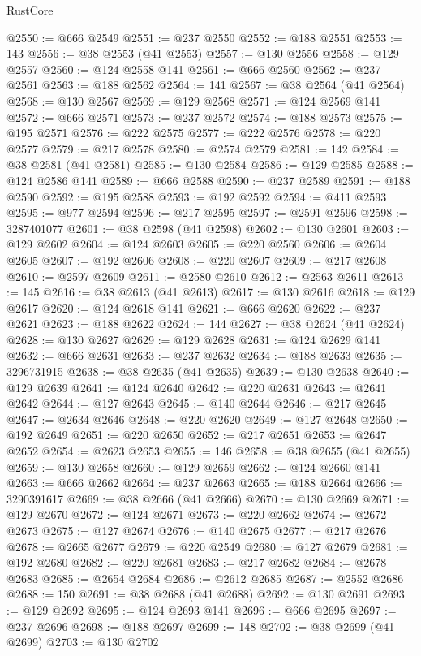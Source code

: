 \begin{lexlean}{RustCore}
\begin{coremodule}
@2550 := @666 @2549
@2551 := @237 @2550
@2552 := @188 @2551
@2553 := 143
@2556 := @38 @2553 (@41 @2553)
@2557 := @130 @2556
@2558 := @129 @2557
@2560 := @124 @2558 @141
@2561 := @666 @2560
@2562 := @237 @2561
@2563 := @188 @2562
@2564 := 141
@2567 := @38 @2564 (@41 @2564)
@2568 := @130 @2567
@2569 := @129 @2568
@2571 := @124 @2569 @141
@2572 := @666 @2571
@2573 := @237 @2572
@2574 := @188 @2573
@2575 := @195 @2571
@2576 := @222 @2575
@2577 := @222 @2576
@2578 := @220 @2577
@2579 := @217 @2578
@2580 := @2574 @2579
@2581 := 142
@2584 := @38 @2581 (@41 @2581)
@2585 := @130 @2584
@2586 := @129 @2585
@2588 := @124 @2586 @141
@2589 := @666 @2588
@2590 := @237 @2589
@2591 := @188 @2590
@2592 := @195 @2588
@2593 := @192 @2592
@2594 := @411 @2593
@2595 := @977 @2594
@2596 := @217 @2595
@2597 := @2591 @2596
@2598 := 3287401077
@2601 := @38 @2598 (@41 @2598)
@2602 := @130 @2601
@2603 := @129 @2602
@2604 := @124 @2603
@2605 := @220 @2560
@2606 := @2604 @2605
@2607 := @192 @2606
@2608 := @220 @2607
@2609 := @217 @2608
@2610 := @2597 @2609
@2611 := @2580 @2610
@2612 := @2563 @2611
@2613 := 145
@2616 := @38 @2613 (@41 @2613)
@2617 := @130 @2616
@2618 := @129 @2617
@2620 := @124 @2618 @141
@2621 := @666 @2620
@2622 := @237 @2621
@2623 := @188 @2622
@2624 := 144
@2627 := @38 @2624 (@41 @2624)
@2628 := @130 @2627
@2629 := @129 @2628
@2631 := @124 @2629 @141
@2632 := @666 @2631
@2633 := @237 @2632
@2634 := @188 @2633
@2635 := 3296731915
@2638 := @38 @2635 (@41 @2635)
@2639 := @130 @2638
@2640 := @129 @2639
@2641 := @124 @2640
@2642 := @220 @2631
@2643 := @2641 @2642
@2644 := @127 @2643
@2645 := @140 @2644
@2646 := @217 @2645
@2647 := @2634 @2646
@2648 := @220 @2620
@2649 := @127 @2648
@2650 := @192 @2649
@2651 := @220 @2650
@2652 := @217 @2651
@2653 := @2647 @2652
@2654 := @2623 @2653
@2655 := 146
@2658 := @38 @2655 (@41 @2655)
@2659 := @130 @2658
@2660 := @129 @2659
@2662 := @124 @2660 @141
@2663 := @666 @2662
@2664 := @237 @2663
@2665 := @188 @2664
@2666 := 3290391617
@2669 := @38 @2666 (@41 @2666)
@2670 := @130 @2669
@2671 := @129 @2670
@2672 := @124 @2671
@2673 := @220 @2662
@2674 := @2672 @2673
@2675 := @127 @2674
@2676 := @140 @2675
@2677 := @217 @2676
@2678 := @2665 @2677
@2679 := @220 @2549
@2680 := @127 @2679
@2681 := @192 @2680
@2682 := @220 @2681
@2683 := @217 @2682
@2684 := @2678 @2683
@2685 := @2654 @2684
@2686 := @2612 @2685
@2687 := @2552 @2686
@2688 := 150
@2691 := @38 @2688 (@41 @2688)
@2692 := @130 @2691
@2693 := @129 @2692
@2695 := @124 @2693 @141
@2696 := @666 @2695
@2697 := @237 @2696
@2698 := @188 @2697
@2699 := 148
@2702 := @38 @2699 (@41 @2699)
@2703 := @130 @2702

\end{coremodule}
\end{lexlean}
